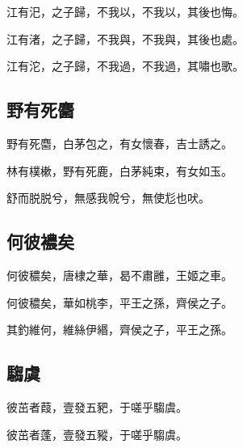 江有汜，之子歸，不我以，不我以，其後也悔。

江有渚，之子歸，不我與，不我與，其後也處。

江有沱，之子歸，不我過，不我過，其嘯也歌。

\subsection[野有死麕]{野有死麕}

野有死麕，白茅包之，有女懷春，吉士誘之。

林有樸樕，野有死鹿，白茅純束，有女如玉。

舒而脱脱兮，無感我帨兮，無使尨也吠。

\subsection[何彼襛矣]{何彼襛矣}

何彼穠矣，唐棣之華，曷不肅雝，王姬之車。

何彼穠矣，華如桃李，平王之孫，齊侯之子。

其釣維何，維絲伊緡，齊侯之子，平王之孫。

\subsection[騶虞]{騶虞}

彼茁者葭，壹發五豝，于嗟乎騶虞。

彼茁者蓬，壹發五豵，于嗟乎騶虞。
